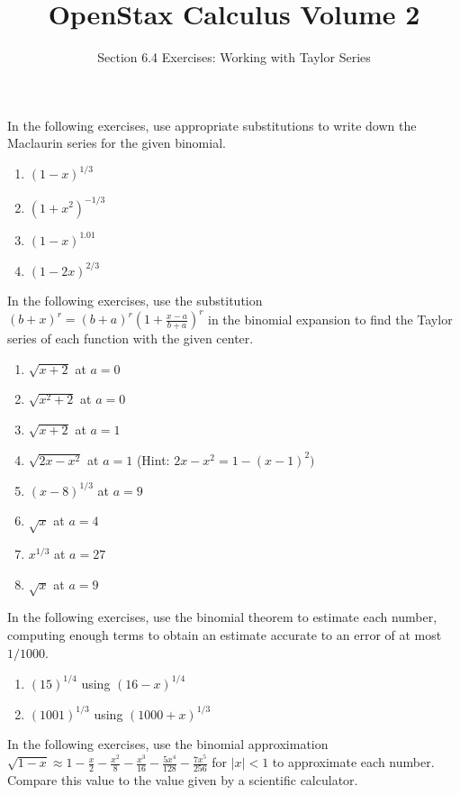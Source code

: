 \documentclass{exercises}
\title{OpenStax Calculus Volume 2}
\subtitle{Section 6.4 Exercises: Working with Taylor Series}
\author{}
\date{}
\begin{document}
\maketitle


In the following exercises, use appropriate substitutions to write down the Maclaurin series for the given binomial.

\begin{enumerate}[start=1]
\item ${(1-x)}^{1/3}$
\item ${(1+x^{2})}^{-1/3}$
\item ${(1-x)}^{1.01}$
\item ${(1-2x)}^{2/3}$
\end{enumerate}

In the following exercises, use the substitution ${(b+x)}^{r}={(b+a)}^{r}{(1+\frac{x-a}{b+a})}^{r}$ in the binomial expansion to find the Taylor series of each function with the given center.

\begin{enumerate}[resume]
\item $\sqrt{x+2}$ at $a=0$
\item $\sqrt{x^{2}+2}$ at $a=0$
\item $\sqrt{x+2}$ at $a=1$
\item $\sqrt{2x-x^{2}}$ at $a=1$ (Hint: $2x-x^{2}=1-{(x-1)}^{2})$
\item ${(x-8)}^{1/3}$ at $a=9$
\item $\sqrt{x}$ at $a=4$
\item $x^{1/3}$ at $a=27$
\item $\sqrt{x}$ at $a=9$
\end{enumerate}

In the following exercises, use the binomial theorem to estimate each number, computing enough terms to obtain an estimate accurate to an error of at most $1/1000$.

\begin{enumerate}[resume]
\item \techrequired ${(15)}^{1/4}$ using ${(16-x)}^{1/4}$
\item \techrequired ${(1001)}^{1/3}$ using ${(1000+x)}^{1/3}$
\end{enumerate}

In the following exercises, use the binomial approximation $\sqrt{1-x}\approx1-\frac{x}{2}-\frac{x^{2}}{8}-\frac{x^{3}}{16}-\frac{5x^{4}}{128}-\frac{7x^{5}}{256}$ for $|x|<1$ to approximate each number. Compare this value to the value given by a scientific calculator.
\end{document}
